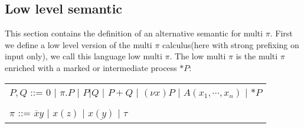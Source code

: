 \subsection{Low level semantic}
This section contains the definition of an alternative semantic for multi $\pi$. First we define a low level version of the multi $\pi$ calculus(here with strong prefixing on input only), we call this language low multi $\pi$. The low multi $\pi$ is the multi $\pi$ enriched with a marked or intermediate process $*P$:
\begin{center}
   \begin{tabular}{l}
     $P,Q$ ::= $0$ | $\pi.P$ | $P|Q$ | $P+Q$ | $(\nu x) P$ | $A(x_{1}, \cdots, x_{n})$ | $*P$
   \\\\
     $\pi$ ::= $\overline{x}y$ | $x(z)$ | $\underline{x(y)}$ | $\tau$ 
   \end{tabular}
\end{center}
